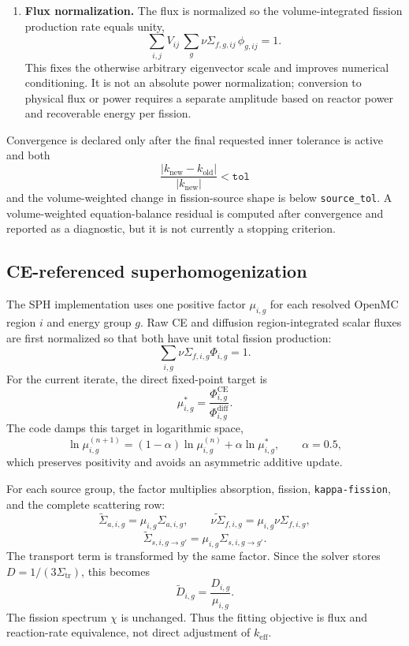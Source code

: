 \documentclass[11pt]{article}
\begin{document}
\begin{enumerate}
        is updated from the ratio of new to old total fission production,
        \[
        k_{\mathrm{new}}
        = k_{\mathrm{old}}\,
        \frac{\sum_{i,j} V_{ij}\,\sum_g \nu\Sigma_{f,g,ij}\,\phi_{g,ij}^{\mathrm{new}}}
             {\sum_{i,j} V_{ij}\,\sum_g \nu\Sigma_{f,g,ij}\,\phi_{g,ij}^{\mathrm{old}}} .
        \]
  \item \textbf{Flux normalization.}  The flux is normalized so the
        volume-integrated fission production rate equals unity,
        \[
        \sum_{i,j} V_{ij}\,\sum_g \nu\Sigma_{f,g,ij}\,\phi_{g,ij} = 1 .
        \]
        This fixes the otherwise arbitrary eigenvector scale and improves
        numerical conditioning.  It is not an absolute power normalization;
        conversion to physical flux or power requires a separate amplitude
        based on reactor power and recoverable energy per fission.
\end{enumerate}

Convergence is declared only after the final requested inner tolerance is
active and both
\[
\frac{|k_{\mathrm{new}}-k_{\mathrm{old}}|}
{|k_{\mathrm{new}}|}<\texttt{tol}
\]
and the volume-weighted change in fission-source shape is below
\texttt{source\_tol}.  A volume-weighted equation-balance residual is computed
after convergence and reported as a diagnostic, but it is not currently a
stopping criterion.

\subsection{CE-referenced superhomogenization}

The SPH implementation uses one positive factor $\mu_{i,g}$ for each resolved
OpenMC region $i$ and energy group $g$.  Raw CE and diffusion
region-integrated scalar fluxes are first normalized so that both have unit
total fission production:
\[
\sum_{i,g}\nu\Sigma_{f,i,g}\Phi_{i,g}=1.
\]
For the current iterate, the direct fixed-point target is
\[
\mu_{i,g}^{*}
=
\frac{\Phi_{i,g}^{\mathrm{CE}}}
     {\Phi_{i,g}^{\mathrm{diff}}}.
\]
The code damps this target in logarithmic space,
\[
\ln\mu_{i,g}^{(n+1)}
=(1-\alpha)\ln\mu_{i,g}^{(n)}
+ \alpha\ln\mu_{i,g}^{*},
\qquad \alpha=0.5 ,
\]
which preserves positivity and avoids an asymmetric additive update.

For each source group, the factor multiplies absorption, fission,
\texttt{kappa-fission}, and the complete scattering row:
\[
\widetilde{\Sigma}_{a,i,g}=\mu_{i,g}\Sigma_{a,i,g},\qquad
\widetilde{\nu\Sigma}_{f,i,g}=\mu_{i,g}\nu\Sigma_{f,i,g},
\]
\[
\widetilde{\Sigma}_{s,i,g\rightarrow g'}
=\mu_{i,g}\Sigma_{s,i,g\rightarrow g'} .
\]
The transport term is transformed by the same factor.  Since the solver stores
$D=1/(3\Sigma_{\mathrm{tr}})$, this becomes
\[
\widetilde{D}_{i,g}=\frac{D_{i,g}}{\mu_{i,g}} .
\]
The fission spectrum $\chi$ is unchanged.  Thus the fitting objective is flux
and reaction-rate equivalence, not direct adjustment of $k_{\mathrm{eff}}$.
\end{document}
